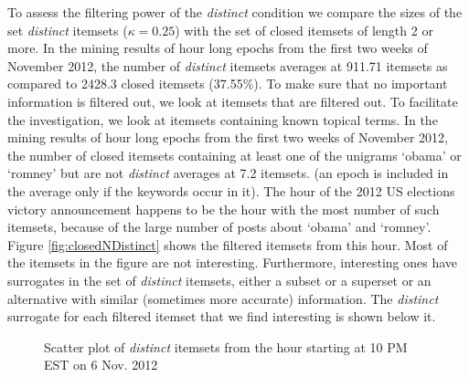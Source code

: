 \documentclass[letterpaper,12pt,titlepage,oneside,final]{book}
\begin{document}
To assess the filtering power of the \emph{distinct} condition
we compare the sizes of 
the set \emph{distinct} itemsets ($\kappa = 0.25$)
with
the set of closed itemsets of length 2 or more. 
In the mining results of hour long epochs from the 
first two weeks of November 2012, 
the number of \emph{distinct} itemsets 
averages at 911.71 itemsets 
as compared to 2428.3 closed itemsets
(37.55\%). 
To make sure that no important information is filtered out, 
we look at itemsets that are filtered out.
To facilitate the investigation, we look at
itemsets containing known topical terms.
In the mining results of hour long epochs from the 
first two weeks of November 2012, 
the number of closed itemsets
containing at least one of the unigrams 
`obama' or `romney' 
but are not \emph{distinct} 
averages at 7.2 itemsets.
(an epoch is included in the average only if the keywords occur in it).
The hour of the 2012 US elections victory announcement happens
to be the hour with the most number of such itemsets, 
because of the large number of posts about `obama' and `romney'.
Figure \ref{fig:closedNDistinct} shows
the filtered itemsets from this hour.
Most of the itemsets in the figure are not interesting.
Furthermore, interesting ones have surrogates
in the set of \emph{distinct} itemsets,
either a subset or a superset or an alternative 
with similar (sometimes more accurate) information.
The \emph{distinct} surrogate for each filtered itemset 
that we find interesting is shown below it.


\begin{landscape}
\begin{figure}
\caption{Scatter plot of \emph{distinct} itemsets from the hour starting at 10 PM EST on 6 Nov. 2012 }
\label{fig:winningHr}
\end{figure}
\end{landscape}
\end{document}
